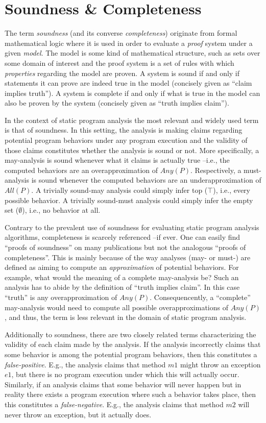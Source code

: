 \section{Soundness \& Completeness}

The term \emph{soundness} (and its converse \emph{completeness}) originate from formal mathematical logic where it is used in order to evaluate a \emph{proof} system under a given \emph{model}. The model is some kind of mathematical structure, such as sets over some domain of interest and the proof system is a set of rules with which \emph{properties} regarding the model are proven. A system is sound if and only if statements it can prove are indeed true in the model (concisely given as ``claim implies truth''). A system is complete if and only if what is true in the model can also be proven by the system (concisely given as ``truth implies claim'').

In the context of static program analysis the most relevant and widely used term is that of soundness. In this setting, the analysis is making claims regarding potential program behaviors under any program execution and the validity of those claims constitutes whether the analysis is sound or not. More specifically, a may-analysis is sound whenever what it claims is actually true --i.e., the computed behaviors are an overapproximation of $Any(P)$. Respectively, a must-analysis is sound whenever the computed behaviors are an underapproximation of $All(P)$. A trivially sound-may analysis could simply infer top ($\top$), i.e., every possible behavior. A trivially sound-must analysis could simply infer the empty set ($\emptyset$), i.e., no behavior at all.

Contrary to the prevalent use of soundness for evaluating static program analysis algorithms, completeness is scarcely referenced --if ever. One can easily find ``proofs of soundness'' on many publications but not the analogous ``proofs of completeness''. This is mainly because of the way analyses (may- or must-) are defined as aiming to compute an \emph{approximation} of potential behaviors. For example, what would the meaning of a complete may-analysis be? Such an analysis has to abide by the definition of ``truth implies claim''. In this case ``truth'' is any overapproximation of $Any(P)$. Consequencently, a ``complete'' may-analysis would need to compute all possible overapproximations of $Any(P)$, and thus, the term is less relevant in the domain of static program analysis.

Additionally to soundness, there are two closely related terms characterizing the validity of each claim made by the analysis. If the analysis incorrectly claims that some behavior is among the potential program behaviors, then this constitutes a \emph{false-positive}. E.g., the analysis claims that method $m1$ might throw an exception $e1$, but there is no program execution under which this will actually occur. Similarly, if an analysis claims that some behavior will never happen but in reality there exists a program execution where such a behavior takes place, then this constitutes a \emph{false-negative}. E.g., the analysis claims that method $m2$ will never throw an exception, but it actually does.

